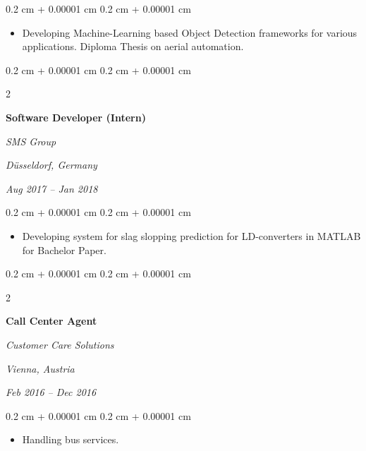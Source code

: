 \documentclass[10pt, letterpaper]{article}
\newenvironment{highlights}{
    \begin{itemize}[
        topsep=0.10 cm,
        parsep=0.10 cm,
        partopsep=0pt,
        itemsep=0pt,
        leftmargin=0.4 cm + 10pt
    ]
}{
    \end{itemize}
} %
\newenvironment{onecolentry}{
    \begin{adjustwidth}{
        0.2 cm + 0.00001 cm
    }{
        0.2 cm + 0.00001 cm
    }
}{
    \end{adjustwidth}
} %
\newenvironment{twocolentry}[2][]{
    \onecolentry
    \def\secondColumn{#2}
    \setcolumnwidth{\fill, 4.5 cm}
    \begin{paracol}{2}
}{
    \switchcolumn \raggedleft \secondColumn
    \end{paracol}
    \endonecolentry
} %
\begin{document}
        \vspace{0.10 cm}
        \begin{onecolentry}
            \begin{highlights}
                \item Developing Machine-Learning based Object Detection frameworks for various applications. Diploma Thesis on aerial automation.
            \end{highlights}
        \end{onecolentry}


        \vspace{0.2 cm}

        \begin{twocolentry}{
        \textit{Düsseldorf, Germany}    
            
        \textit{Aug 2017 – Jan 2018}}
            \textbf{Software Developer (Intern)}
            
            \textit{SMS Group}
        \end{twocolentry}

        \vspace{0.10 cm}
        \begin{onecolentry}
            \begin{highlights}
                \item Developing system for slag slopping prediction for LD-converters in MATLAB for Bachelor Paper.
            \end{highlights}
        \end{onecolentry}


        \vspace{0.2 cm}

        \begin{twocolentry}{
        \textit{Vienna, Austria}    
            
        \textit{Feb 2016 – Dec 2016}}
            \textbf{Call Center Agent}
            
            \textit{Customer Care Solutions}
        \end{twocolentry}

        \vspace{0.10 cm}
        \begin{onecolentry}
            \begin{highlights}
                \item Handling bus services.
            \end{highlights}
        \end{onecolentry}
\end{document}
